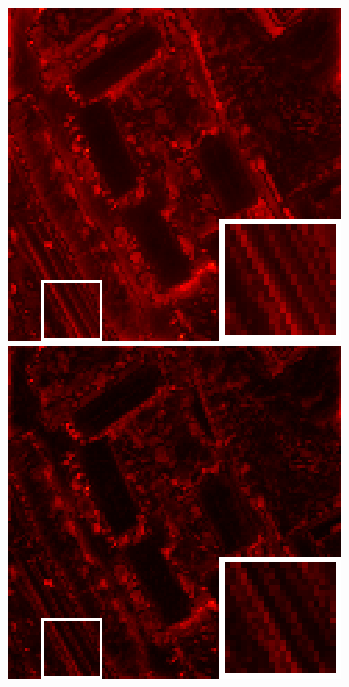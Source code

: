 \begin{figure}[t]
\begin{center}
\begin{minipage}{0.15\hsize}
		\end{minipage}
		\begin{minipage}{0.15\hsize}
			\centerline{\includegraphics[width=\hsize]{./fig_supplement/SAM_map_color_woboundary/PaviaU120/sam_map_STV.eps}} %
		\end{minipage}
		\begin{minipage}{0.15\hsize}
			\centerline{\includegraphics[width=\hsize]{./fig_supplement/SAM_map_color_woboundary/PaviaU120/sam_map_SSST.eps}} %
		\end{minipage}
		\begin{minipage}{0.050\hsize}
			\centerline{\hspace{\hsize}} %
		\end{minipage}
		

\end{center}
\end{figure}
